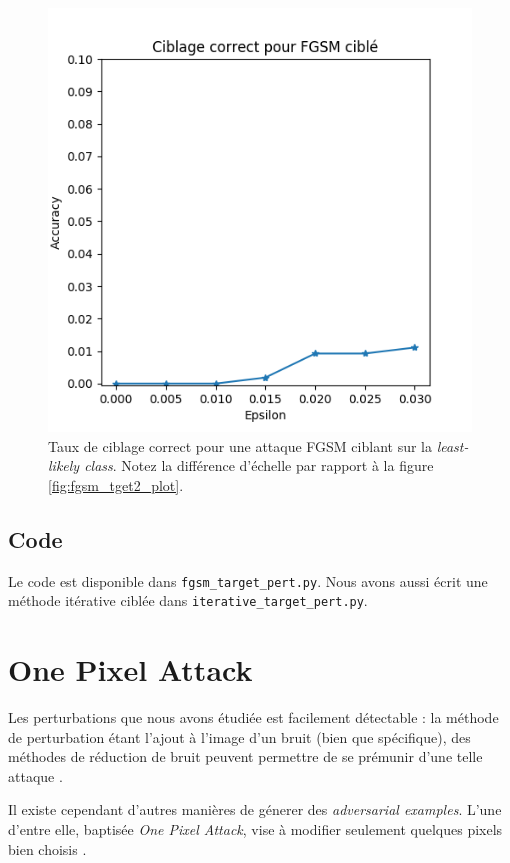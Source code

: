\documentclass[10pt,twocolumn,letterpaper]{article}
\begin{document}
\begin{figure}[!h]
\begin{center}
\includegraphics[width=0.85\linewidth]{ressources/fgsm_least2_plot.png}
\end{center}
   \caption{Taux de ciblage correct pour une attaque FGSM ciblant sur la \textit{least-likely class}. Notez la différence d'échelle par rapport à la figure \ref{fig:fgsm_tget2_plot}.}
\label{fig:fgsm_least2_plot}
\end{figure}

\subsection{Code}

Le code est disponible dans \texttt{fgsm\_target\_pert.py}. Nous avons aussi écrit une méthode itérative ciblée dans \texttt{iterative\_target\_pert.py}.
\section{One Pixel Attack}

Les perturbations que nous avons étudiée est facilement détectable : la méthode de perturbation étant l'ajout à l'image d'un bruit (bien que spécifique), des méthodes de réduction de bruit peuvent permettre de se prémunir d'une telle attaque \cite{liang2018}.

Il existe cependant d'autres manières de génerer des \textit{adversarial examples}. L'une d'entre elle, baptisée \textit{One Pixel Attack}, vise à modifier seulement quelques pixels bien choisis \cite{su2019}.
\end{document}
